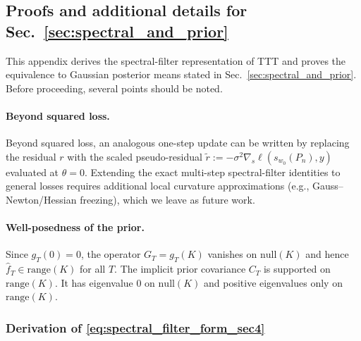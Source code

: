 \documentclass{article}
\theoremstyle{plain}
\theoremstyle{definition}
\theoremstyle{remark}
\begin{document}
\subsection{Proofs and additional details for Sec.~\ref{sec:spectral_and_prior}}
\label{app:implicit_prior}

This appendix derives the spectral-filter representation of TTT and proves the equivalence to Gaussian posterior means stated in Sec.~\ref{sec:spectral_and_prior}. Before proceeding, several points should be noted.

\paragraph{Beyond squared loss.}
Beyond squared loss, an analogous one-step update can be written by replacing the residual $r$ with the scaled pseudo-residual $\tilde r := -\sigma^2 \nabla_s \ell(s_{w_0}(P_n),y)$ evaluated at $\theta=0$. Extending the exact multi-step spectral-filter identities to general losses requires additional local curvature approximations (e.g., Gauss--Newton/Hessian freezing), which we leave as future work.

\paragraph{Well-posedness of the prior.}
Since $g_T(0)=0$, the operator $G_T=g_T(K)$ vanishes on $\mathrm{null}(K)$ and hence $\hat f_T\in \mathrm{range}(K)$ for all $T$. The implicit prior covariance $C_T$ is supported on $\mathrm{range}(K)$. It has eigenvalue $0$ on $\mathrm{null}(K)$ and positive eigenvalues only on $\mathrm{range}(K)$.


\subsubsection{Derivation of \eqref{eq:spectral_filter_form_sec4}}
\label{app:proof_spectral_filter}
\end{document}
